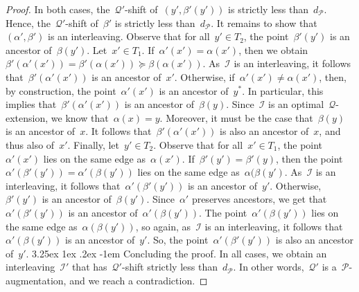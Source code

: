 \documentclass[11pt]{article}
\makeatletter
\newcommand{\resdist}[1]{d_{#1}}
\newcommand{\I}{\mathcal{I}}
\renewcommand{\P}{\mathcal{P}}
\newcommand{\Q}{\mathcal{Q}}
\newcommand{\enumit}[1]{\textcolor{darkgray}{\sffamily\bfseries\upshape\mathversion{bold}#1}}
\newcommand{\proofsubparagraph}{\@startsection{subparagraph}{5}{\z@}%
                                       {3.25ex \@plus1ex \@minus .2ex}%
                                       {-1em}%
                                      {\color{lipicsGray}\sffamily\normalsize\bfseries}}
\makeatother
\begin{document}
\begin{proof}
    In both cases, the~$\Q'$-shift of~$(y', \beta'(y'))$ is strictly less than~$\resdist{\P}$.
    Hence, the~$\Q'$-shift of~$\beta'$ is strictly less than~$\resdist{\P}$.
%
    It remains to show that~$(\alpha',\beta')$ is an interleaving.
    Observe that for all~$y' \in T_2$, the point~$\beta'(y')$ is an ancestor of~$\beta(y')$. 
    Let~$x' \in T_1$.
    If~$\alpha'(x') = \alpha(x')$, then we obtain~$\beta'(\alpha'(x')) = \beta'(\alpha(x')) \succeq \beta(\alpha(x'))$.
    As~$\I$ is an interleaving, it follows that~$\beta'(\alpha'(x'))$ is an ancestor of~$x'$.
    Otherwise, if~$\alpha'(x') \neq \alpha(x')$, then, by construction, the point~$\alpha'(x')$ is an ancestor of~$y^*$.
    In particular, this implies that~$\beta'(\alpha'(x'))$ is an ancestor of~$\beta(y)$.
    Since~$\I$ is an optimal~$\Q$-extension, we know that~$\alpha(x) = y$.
    Moreover, it must be the case that~$\beta(y)$ is an ancestor of~$x$.
    It follows that~$\beta'(\alpha'(x'))$ is also an ancestor of~$x$, and thus also of~$x'$.    
    Finally, let~$y' \in T_2$.
    Observe that for all~$x' \in T_1$, the point~$\alpha'(x')$ lies on the same edge as~$\alpha(x')$.
    If~$\beta'(y') = \beta'(y)$, then the point~$\alpha'(\beta'(y')) = \alpha'(\beta(y'))$ lies on the same edge as~$\alpha(\beta(y')$.
    As~$\I$ is an interleaving, it follows that~$\alpha'(\beta'(y'))$ is an ancestor of~$y'$.
    Otherwise,~$\beta'(y')$ is an ancestor of~$\beta(y')$.
    Since~$\alpha'$ preserves ancestors, we get that~$\alpha'(\beta'(y'))$ is an ancestor of~$\alpha'(\beta(y'))$.
    The point~$\alpha'(\beta(y'))$ lies on the same edge as~$\alpha(\beta(y'))$, so again, as~$\I$ is an interleaving, it follows that~$\alpha'(\beta(y'))$ is an ancestor of~$y'$.
    So, the point~$\alpha'(\beta'(y'))$ is also an ancestor of~$y'$.
%
%
    \proofsubparagraph{Concluding the proof.}
    In all cases, we obtain an interleaving~$\I'$ that has~$\Q'$-shift strictly less than~$\resdist{\P}$.
    In other words,~$\Q'$ is a~$\P$-augmentation, and we reach a contradiction.
\end{proof}
%
%
\end{document}
